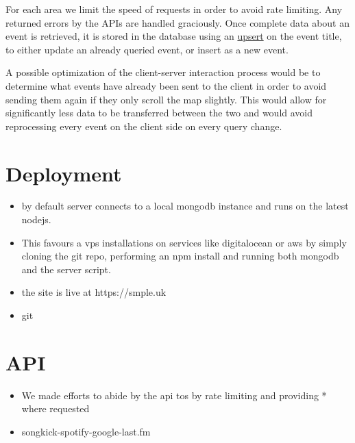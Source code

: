 \documentclass[10pt]{article}
\begin{document}
        For each area we limit the speed of requests in order to avoid rate limiting. Any returned errors by the APIs are handled graciously. Once complete data about an event is retrieved, it is stored in the database using an \href{https://docs.mongodb.com/manual/reference/method/db.collection.update/#upsert-option}{upsert} on the event title, to either update an already queried event, or insert as a new event.

        A possible optimization of the client-server interaction process would be to determine what events have already been sent to the client in order to avoid sending them again if they only scroll the map slightly. This would allow for significantly less data to be transferred between the two and would avoid reprocessing every event on the client side on every query change.


    \section{Deployment}
        \begin{itemize}
            \item by default server connects to a local mongodb instance and runs on the latest nodejs.
            \item This favours a vps installations on services like digitalocean or aws by simply cloning the git repo, performing an npm install and running both mongodb and the server script.
            \item the site is live at https://smple.uk
            \item git
        \end{itemize}

    \section{API}
        \begin{itemize}
            \item We made efforts to abide by the api tos by rate limiting and providing * where requested
            \item songkick-spotify-google-last.fm
        \end{itemize}


\end{document}
